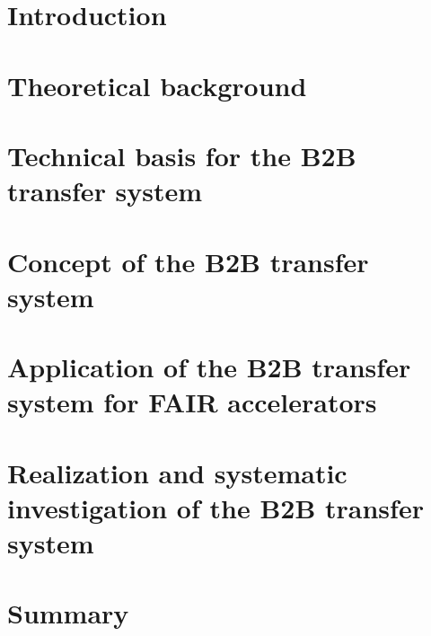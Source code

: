 \documentclass[12pt,twoside]{report}
\begin{document}




\chapter{Introduction}

\chapter{Theoretical background}

%
\chapter{Technical basis for the B2B transfer system}

\chapter{Concept of the B2B transfer system}

\chapter{Application of the B2B transfer system for FAIR accelerators}

\chapter{Realization and systematic investigation of the B2B transfer system}

%
\chapter{Summary}

\end{document}
